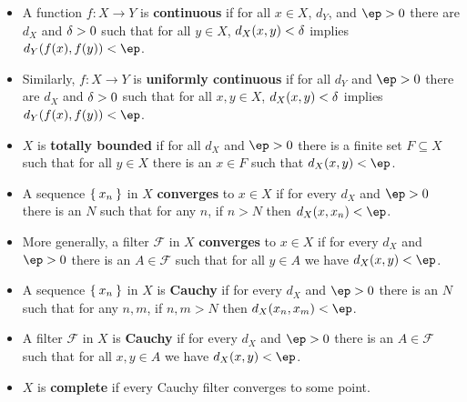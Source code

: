 \documentclass{article}
\def\F{\mathcal{F}}
\begin{document}
\begin{itemize}
\item A function $f:X\to Y$ is \textbf{continuous} if for all $x\in X$, $d_Y$, and $\ep>0$ there are $d_X$ and $\delta>0$ such that for all $y\in X$, $d_X(x,y)<\delta$ implies $d_Y(f(x),f(y))<\ep$.
\item Similarly, $f:X\to Y$ is \textbf{uniformly continuous} if for all $d_Y$ and $\ep>0$ there are $d_X$ and $\delta>0$ such that for all $x,y\in X$, $d_X(x,y)<\delta$ implies $d_Y(f(x),f(y))<\ep$.
\item $X$ is \textbf{totally bounded} if for all $d_X$ and $\ep>0$ there is a finite set $F\subseteq X$ such that for all $y\in X$ there is an $x\in F$ such that $d_X(x,y)<\ep$.
\item A sequence $\Set{x_n}$ in $X$ \textbf{converges} to $x\in X$ if for every $d_X$ and $\ep>0$ there is an $N$ such that for any $n$, if $n>N$ then $d_X(x,x_n)<\ep$.
\item More generally, a filter $\F$ in $X$ \textbf{converges} to $x\in X$ if for every $d_X$ and $\ep>0$ there is an $A\in\F$ such that for all $y\in A$ we have $d_X(x,y)<\ep$.
\item A sequence $\Set{x_n}$ in $X$ is \textbf{Cauchy} if for every $d_X$ and $\ep>0$ there is an $N$ such that for any $n,m$, if $n,m>N$ then $d_X(x_n,x_m)<\ep$.
\item A filter $\F$ in $X$ is \textbf{Cauchy} if for every $d_X$ and $\ep>0$ there is an $A\in\F$ such that for all $x,y\in A$ we have $d_X(x,y)<\ep$.
\item $X$ is \textbf{complete} if every Cauchy filter converges to some point.
\end{itemize}
\end{document}
